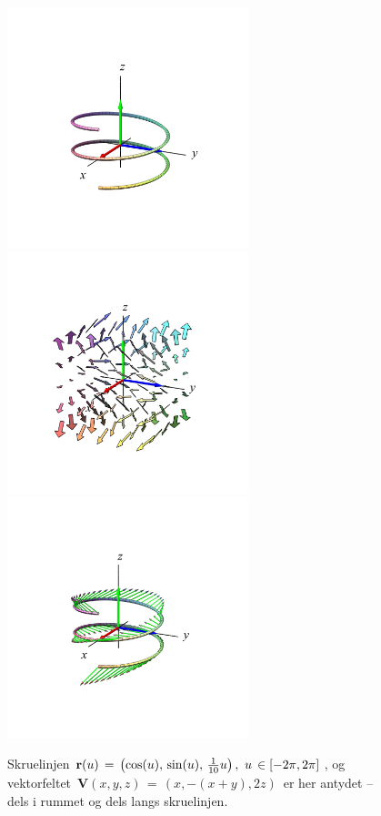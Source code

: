 \begin{figure}[t]
\centerline{\includegraphics[height=70mm]{FIGS/plotTangKurve3}\includegraphics[height=70mm]{FIGS/plotTangKurve2}\includegraphics[height=70mm]{FIGS/plotTangKurve1}}
\begin{center}
\caption{\small{Skruelinjen ${\bf r}(u) \, = \,
\left(\cos(u), \,\sin(u),\, \frac{1}{10}u\right),
\, \, u \, \in [-2\pi, 2\pi]\,$, og vektorfeltet
$\, {\mathbf{V}}(x,y,z) \, = \, (x, -(x+y), 2z)\, $
er her antydet -- dels i rummet og dels langs skruelinjen.}} \label{figHelixVectors}
\end{center}
\end{figure}

